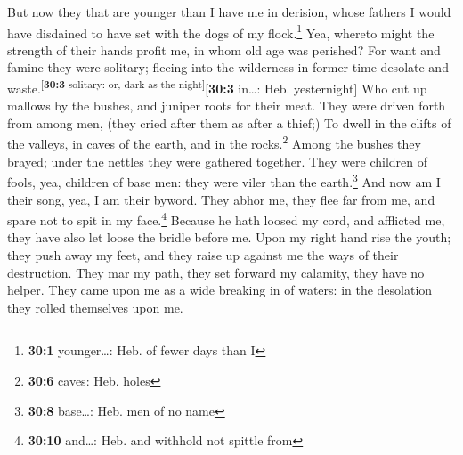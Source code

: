  But now they that are younger than I have me in derision,
whose fathers I would have disdained to have set with the dogs of my
flock.\footnote{\textbf{30:1} younger\ldots: Heb. of fewer days than I}
 Yea, whereto might the strength of their hands profit me,
in whom old age was perished?  For want and famine they
were solitary; fleeing into the wilderness in former time desolate and
waste.\textsuperscript{{[}\textbf{30:3} solitary: or, dark as the
night{]}}{[}\textbf{30:3} in\ldots: Heb. yesternight{]} 
Who cut up mallows by the bushes, and juniper roots for their meat.
 They were driven forth from among men, (they cried after
them as after a thief;)  To dwell in the clifts of the
valleys, in caves of the earth, and in the rocks.\footnote{\textbf{30:6}
  caves: Heb. holes}  Among the bushes they brayed; under
the nettles they were gathered together.  They were
children of fools, yea, children of base men: they were viler than the
earth.\footnote{\textbf{30:8} base\ldots: Heb. men of no name}
 And now am I their song, yea, I am their byword.
 They abhor me, they flee far from me, and spare not to
spit in my face.\footnote{\textbf{30:10} and\ldots: Heb. and withhold
  not spittle from}  Because he hath loosed my cord, and
afflicted me, they have also let loose the bridle before me.
 Upon my right hand rise the youth; they push away my
feet, and they raise up against me the ways of their destruction.
 They mar my path, they set forward my calamity, they
have no helper.  They came upon me as a wide breaking in
of waters: in the desolation they rolled themselves upon me.

